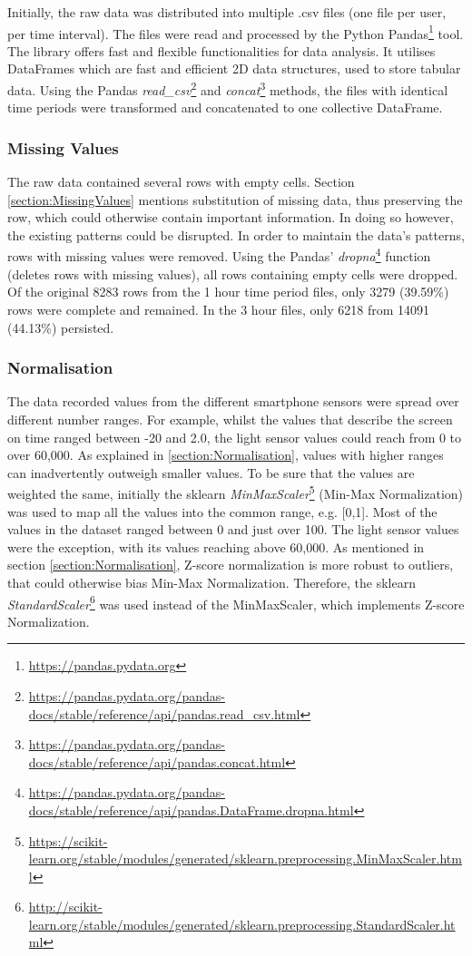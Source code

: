 Initially, the raw data was distributed into multiple .csv files (one file per user, per time interval). The files were read and processed by the Python Pandas\footnote{\url{https://pandas.pydata.org}} tool. The library offers fast and flexible functionalities for data analysis. It utilises DataFrames which are fast and efficient 2D data structures, used to store tabular data. Using the Pandas \textit{read\_csv}\footnote{\url{https://pandas.pydata.org/pandas-docs/stable/reference/api/pandas.read_csv.html}} and \textit{concat}\footnote{\url{https://pandas.pydata.org/pandas-docs/stable/reference/api/pandas.concat.html}} methods, the files with identical time periods were transformed and concatenated to one collective DataFrame. 


\subsubsection{Missing Values}
The raw data contained several rows with empty cells. Section \ref{section:MissingValues} mentions substitution of missing data, thus preserving the row, which could otherwise contain important information. In doing so however, the existing patterns could be disrupted. In order to maintain the data's patterns, rows with missing values were removed. Using the Pandas' \textit{dropna}\footnote{\url{https://pandas.pydata.org/pandas-docs/stable/reference/api/pandas.DataFrame.dropna.html}} function (deletes rows with missing values), all rows containing empty cells were dropped. Of the original 8283 rows from the 1 hour time period files, only 3279 (39.59\%) rows were complete and remained. In the 3 hour files, only 6218 from 14091 (44.13\%) persisted.

\subsubsection{Normalisation}
The data recorded values from the different smartphone sensors were spread over different number ranges. For example, whilst the values that describe the screen on time ranged between -20 and 2.0, the light sensor values could reach from 0 to over 60,000. As explained in \ref{section:Normalisation}, values with higher ranges can inadvertently outweigh smaller values. To be sure that the values are weighted the same, initially the sklearn \textit{MinMaxScaler}\footnote{\url{https://scikit-learn.org/stable/modules/generated/sklearn.preprocessing.MinMaxScaler.html}} (Min-Max Normalization) was used to map all the values into the common range, e.g. [0,1]. Most of the values in the dataset ranged between 0 and just over 100. The light sensor values were the exception, with its values reaching above 60,000. As mentioned in section \ref{section:Normalisation}, Z-score normalization is more robust to outliers, that could otherwise bias Min-Max Normalization. Therefore, the sklearn \textit{StandardScaler}\footnote{\url{http://scikit-learn.org/stable/modules/generated/sklearn.preprocessing.StandardScaler.html}} was used instead of the MinMaxScaler, which implements Z-score Normalization.

